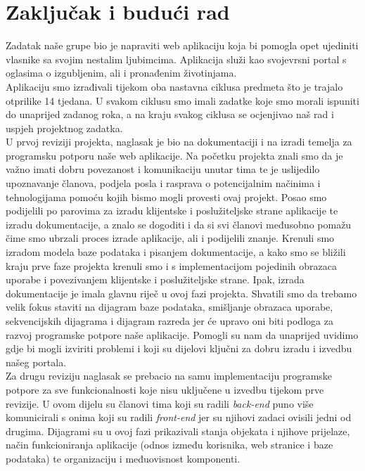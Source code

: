\chapter{Zaključak i budući rad}
		
		Zadatak naše grupe bio je napraviti web aplikaciju koja bi pomogla opet ujediniti vlasnike sa svojim nestalim ljubimcima. Aplikacija služi kao svojevrsni portal s oglasima o izgubljenim, ali i pronađenim životinjama.\\
		Aplikaciju smo izrađivali tijekom oba nastavna ciklusa predmeta što je trajalo otprilike 14 tjedana. U svakom ciklusu smo imali zadatke koje smo morali ispuniti do unaprijed zadanog roka, a na kraju svakog ciklusa se ocjenjivao naš rad i uspjeh projektnog zadatka.\\
		U prvoj reviziji projekta, naglasak je bio na dokumentaciji i na izradi temelja za programsku potporu naše web aplikacije. Na početku projekta znali smo da je važno imati dobru povezanost i komunikaciju unutar tima te je uslijedilo upoznavanje članova, podjela posla i rasprava o potencijalnim načinima i tehnologijama pomoću kojih bismo mogli provesti ovaj projekt. Posao smo podijelili po parovima za izradu klijentske i poslužiteljske strane aplikacije te izradu dokumentacije, a znalo se dogoditi i da si svi članovi međusobno pomažu čime smo ubrzali proces izrade aplikacije, ali i podijelili znanje. Krenuli smo izradom modela baze podataka i pisanjem dokumentacije, a kako smo se bližili kraju prve faze projekta krenuli smo i s implementacijom pojedinih obrazaca uporabe i povezivanjem klijentske i poslužiteljske strane. Ipak, izrada dokumentacije je imala glavnu riječ u ovoj fazi projekta. Shvatili smo da trebamo velik fokus staviti na dijagram baze podataka, smišljanje obrazaca uporabe, sekvencijskih dijagrama i dijagram razreda jer će upravo oni biti podloga za razvoj programske potpore naše aplikacije. Pomogli su nam da unaprijed uvidimo gdje bi mogli izviriti problemi i koji su dijelovi ključni za dobru izradu i izvedbu našeg portala.\\
		Za drugu reviziju naglasak se prebacio na samu implementaciju programske potpore za sve funkcionalnosti koje nisu uključene u izvedbu tijekom prve revizije. U ovom dijelu su članovi tima koji su radili \textit{back-end} puno više komunicirali s onima koji su radili \textit{front-end} jer su njihovi zadaci ovisili jedni od drugima. Dijagrami su u ovoj fazi prikazivali stanja objekata i njihove prijelaze, način funkcioniranja aplikacije (odnos između korisnika, web stranice i baze podataka) te organizaciju i međuovisnost komponenti.\\
